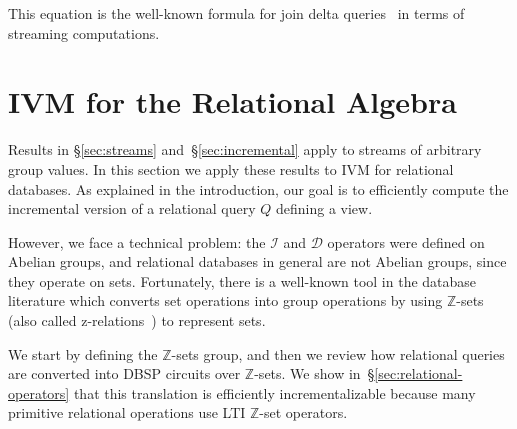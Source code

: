 \documentclass[twocolumn
]{svjour3}
\numberwithin{equation}{section}
\newcommand{\dbsp}{DBSP\xspace}
\newcommand{\zr}{$\Z$-set\xspace}
\newcommand{\zrs}{$\Z$-sets\xspace} %
\newcommand{\Z}{\mathbb{Z}}  %
\newcommand{\zm}{\ensuremath{z^{-1}}} %
\newcommand{\I}{\mathcal{I}}  %
\newcommand{\D}{\mathcal{D}}  %
\newcommand{\I}{\mathit{I}}  %
\newcommand{\D}{\mathit{D}}  %
\newcommand{\secref}[1]{\S\ref{#1}}  %
\newcommand{\refsec}[1]{\secref{#1}}
\begin{document}
\begin{theorem}[Bilinear]
\begin{tabular}{m{3.3cm}m{0cm}m{4cm}}
\end{tabular}
\end{theorem}

This equation is the well-known formula for join delta
queries~\cite{koch-pods10} in terms of streaming computations.


%
\section{IVM for the Relational Algebra}\label{sec:relational}

Results in \secref{sec:streams} and~\secref{sec:incremental}
apply to streams of arbitrary group values.  In this
section we apply these results to
IVM for relational databases.  As explained in the introduction, our goal is to
efficiently compute the incremental version of a relational query $Q$
defining a view.

However, we face a technical problem: the $\I$ and $\D$ operators were
defined on Abelian groups, and relational databases in general are
not Abelian groups, since they operate on sets.  Fortunately,
there is a well-known tool in the database literature
which converts set operations into group operations by using \zrs
(also called z-relations~\cite{green-tcs11}) to represent sets.

We start by defining the \zrs group, and then we review how relational
queries are converted into \dbsp circuits over \zrs.  We show
in~\refsec{sec:relational-operators} that this translation is
efficiently incrementalizable because many primitive relational
operations use LTI \zr operators.
\end{document}
